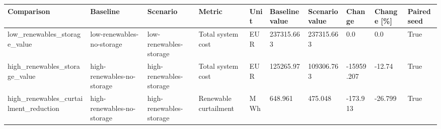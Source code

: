 \begin{tabular}{llllllllll}
\toprule
Comparison & Baseline & Scenario & Metric & Unit & Baseline value & Scenario value & Change & Change [\%] & Paired seed \\
\midrule
low\_renewables\_storage\_value & low-renewables-no-storage & low-renewables-storage & Total system cost & EUR & 237315.663 & 237315.663 & 0.0 & 0.0 & True \\
high\_renewables\_storage\_value & high-renewables-no-storage & high-renewables-storage & Total system cost & EUR & 125265.97 & 109306.763 & -15959.207 & -12.74 & True \\
high\_renewables\_curtailment\_reduction & high-renewables-no-storage & high-renewables-storage & Renewable curtailment & MWh & 648.961 & 475.048 & -173.913 & -26.799 & True \\
\bottomrule
\end{tabular}
